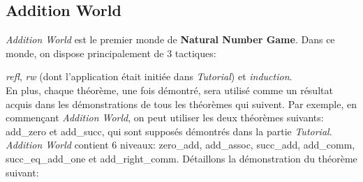 \subsection{Addition World}

\textit{Addition World} est le premier monde de \textbf{Natural Number Game}. Dans ce monde, on dispose principalement de 3 tactiques: 

\textit{refl}, \textit{rw} (dont l'application était initiée dans \textit{Tutorial}) et \textit{induction}.\\
En plus, chaque théorème, une fois démontré, sera utilisé comme un résultat acquis dans les démonstrations de tous les théorèmes qui suivent. Par exemple, en commençant \textit{Addition World}, on peut utiliser les deux théorèmes suivants: add\_zero et add\_succ, qui sont supposés démontrés dans la partie \textit{Tutorial}.\\

\textit{Addition World} contient 6 niveaux: zero\_add, add\_assoc, succ\_add, add\_comm, succ\_eq\_add\_one et add\_right\_comm.
Détaillons la démonstration du théorème suivant:\\

